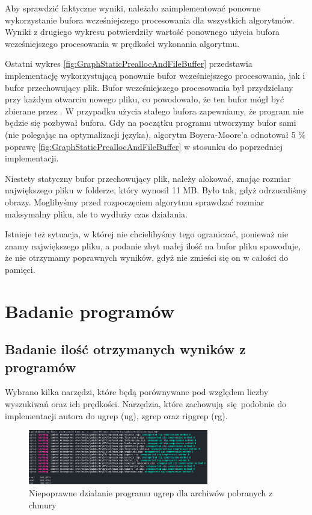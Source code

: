 Aby sprawdzić faktyczne wyniki, należało zaimplementować ponowne wykorzystanie
bufora wcześniejszego procesowania dla wszystkich algorytmów. Wyniki z drugiego wykresu 
potwierdziły wartość ponownego użycia bufora wcześniejszego procesowania w prędkości wykonania
algorytmu.

Ostatni wykres \ref{fig:GraphStaticPreallocAndFileBuffer} przedstawia implementację
wykorzystującą ponownie bufor wcześniejszego procesowania, jak i bufor przechowujący plik.
Bufor wcześniejszego procesowania był przydzielany przy każdym otwarciu nowego pliku,
co powodowało, że ten bufor mógł być zbierane przez .
W przypadku użycia stałego bufora zapewniamy, że program nie będzie się pozbywał
bufora. Gdy na początku programu utworzymy bufor sami (nie polegając na optymalizacji języka),
algorytm Boyera-Moore'a odnotował 5 \% poprawę \ref{fig:GraphStaticPreallocAndFileBuffer}
w stosunku do poprzedniej implementacji.

Niestety statyczny bufor przechowujący plik, należy alokować, znając rozmiar 
największego pliku w folderze, który wynosił 11 MB. Było tak, gdyż odrzucaliśmy
obrazy. Moglibyśmy przed rozpoczęciem algorytmu sprawdzać rozmiar maksymalny 
pliku, ale to wydłuży czas działania. 

Istnieje też sytuacja, w której nie chcielibyśmy tego ograniczać, ponieważ nie
znamy największego pliku, a podanie zbyt małej ilość na bufor pliku spowoduje,
że nie otrzymamy poprawnych wyników, gdyż nie zmieści się on w całości do 
pamięci.


\section{Badanie programów}

\subsection{Badanie ilość otrzymanych wyników z programów}

Wybrano kilka narzędzi, które będą porównywane pod względem liczby wyszukiwań
oraz ich prędkości. Narzędzia, które zachowują się podobnie do implementacji
autora do ugrep (ug), zgrep oraz ripgrep (rg). 

\begin{figure}[h]
\centering
\includegraphics[width=0.7\textwidth]{./images/ugrep-errors.png}
\caption{Niepoprawne działanie programu ugrep dla archiwów pobranych z chmury}
\label{fig:ugrepErrors}
\end{figure}

